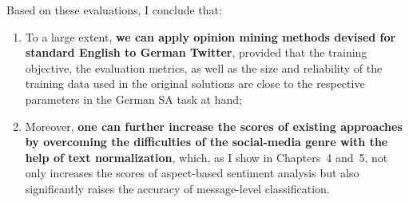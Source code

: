 \documentclass[11pt]{article}
\begin{document}
Based on these evaluations, I conclude that:
\begin{enumerate}[resume*]
  \item To a large extent, \textbf{we can apply opinion mining methods
    devised for standard English to German Twitter}, provided that the
    training objective, the evaluation metrics, as well as the size
    and reliability of the training data used in the original
    solutions are close to the respective parameters in the German SA
    task at hand;
  \item Moreover, \textbf{one can further increase the scores of
    existing approaches by overcoming the difficulties of the
    social-media genre with the help of text normalization}, which, as
    I show in Chapters~4 and~5, not only increases the scores of
    aspect-based sentiment analysis but also significantly raises the
    accuracy of message-level classification.
\end{enumerate}
\end{document}
